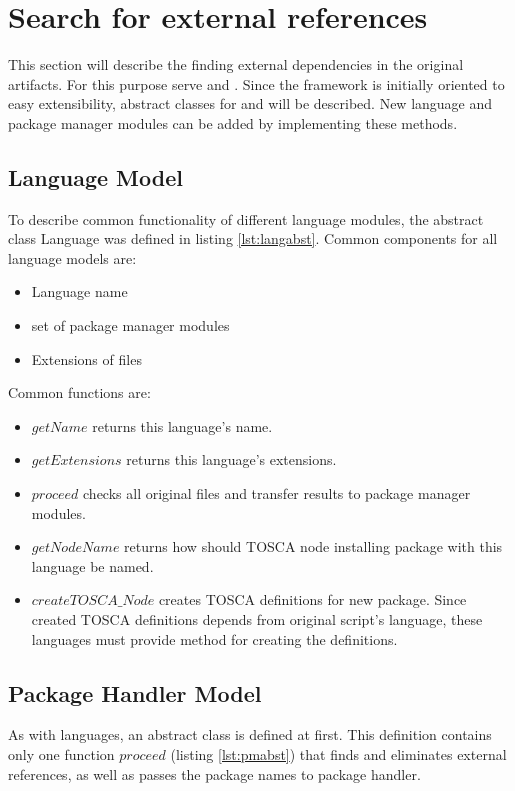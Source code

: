 \section{Search for external references}
This section will describe the finding external dependencies in the original artifacts.
For this purpose serve  and .
Since the framework is initially oriented to easy extensibility, abstract classes for  and  will be described.
New language and package manager modules can be added by implementing these methods.

\subsection*{Language Model}
To describe common functionality of different language modules, the abstract class Language was defined in listing \ref{lst:langabst}.
Common components for all language models are: 
\begin{itemize}
	\item Language name
	\item set of package manager modules
	\item Extensions of files
\end{itemize}
Common functions are: 
\begin{itemize}
	\item $getName$ returns this language's name.
	\item $getExtensions$ returns this language's extensions.
	\item $proceed$ checks all original files and transfer results to package manager modules.
	\item $getNodeName$ returns how should TOSCA node installing package with this language be named.
	\item $createTOSCA\_Node$ creates TOSCA definitions for new package. 
	Since created TOSCA definitions depends from original script's language, these languages must provide method for creating the definitions.
\end{itemize}

\subsection*{Package Handler Model}
As with languages, an abstract class is defined at first.
This definition contains only one function $proceed$ (listing \ref{lst:pmabst}) that finds and eliminates external references, as well as passes the package names to package handler.

